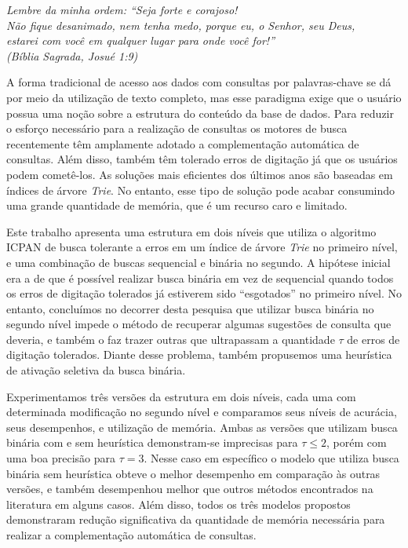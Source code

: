 \documentclass[
	12pt,				%
	openright,			%
	twoside,			%
	a4paper,			%
	english,			%
	spanish,			%
	brazil,				%
	]{abntex2}
\begin{document}

\begin{epigrafe}
    \vspace*{\fill}
	\begin{flushright}
		\textit{
		Lembre da minha ordem: ``Seja forte e corajoso!
		\\ Não fique desanimado, nem tenha medo, porque eu, o Senhor, seu Deus,
		\\ estarei com você em  qualquer lugar para onde você for!''
		\\ (Bíblia Sagrada, Josué 1:9)}
	\end{flushright}
\end{epigrafe}
\newpage
\newpage


\begin{resumo}
A forma tradicional de acesso aos dados com consultas por palavras-chave se dá por meio da utilização de texto completo, mas esse paradigma exige que o usuário possua uma noção sobre a estrutura do conteúdo da base de dados. Para reduzir o esforço necessário para a realização de consultas os motores de busca recentemente têm amplamente adotado a complementação automática de consultas. Além disso, também têm tolerado erros de digitação já que os usuários podem cometê-los. As soluções mais eficientes dos últimos anos são baseadas em índices de árvore \textit{Trie}. No entanto, esse tipo de solução pode acabar consumindo uma grande quantidade de memória, que é um recurso caro e limitado.

Este trabalho apresenta uma estrutura em dois níveis que utiliza o algoritmo ICPAN de busca tolerante a erros em um índice de árvore \textit{Trie} no primeiro nível, e uma combinação de buscas sequencial e binária no segundo. A hipótese inicial era a de que é possível realizar busca binária em vez de sequencial quando todos os erros de digitação tolerados já estiverem sido ``esgotados'' no primeiro nível. No entanto, concluímos no decorrer desta pesquisa que utilizar busca binária no segundo nível impede o método de recuperar algumas sugestões de consulta que deveria, e também o faz trazer outras que ultrapassam a quantidade $\tau$ de erros de digitação tolerados. Diante desse problema, também propusemos uma heurística de ativação seletiva da busca binária. 

Experimentamos três versões da estrutura em dois níveis, cada uma com determinada modificação no segundo nível e comparamos seus níveis de acurácia, seus desempenhos, e utilização de memória. Ambas as versões que utilizam busca binária com e sem heurística demonstram-se imprecisas para $\tau \leq 2$, porém com uma boa precisão para $\tau=3$. Nesse caso em específico o modelo que utiliza busca binária sem heurística obteve o melhor desempenho em comparação às outras versões, e também desempenhou melhor que outros métodos encontrados na literatura em alguns casos. Além disso, todos os três modelos propostos demonstraram redução significativa da quantidade de memória necessária para realizar a complementação automática de consultas.


\end{resumo}
\end{document}

